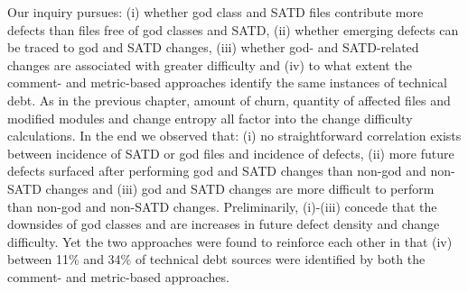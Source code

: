 Our inquiry pursues: (i) whether god class and SATD files contribute more defects than files free of god classes and SATD, (ii) whether emerging defects can be traced to god and SATD changes, (iii) whether god- and SATD-related changes are associated with greater difficulty and (iv) to what extent the comment- and metric-based approaches identify the same instances of technical debt. As in the previous chapter, amount of churn, quantity of affected files and modified modules and change entropy all factor into the change difficulty calculations. In the end we observed that: (i) no straightforward correlation exists between incidence of SATD or god files and incidence of defects, (ii) more future defects surfaced after performing god and SATD changes than non-god and non-SATD changes and (iii) god and SATD changes are more difficult to perform than non-god and non-SATD changes. Preliminarily, (i)-(iii) concede that the downsides of god classes and \SATD are increases in future defect density and change difficulty. Yet the two approaches were found to reinforce each other in that (iv) between 11\% and 34\% of technical debt sources were identified by both the comment- and metric-based approaches.



